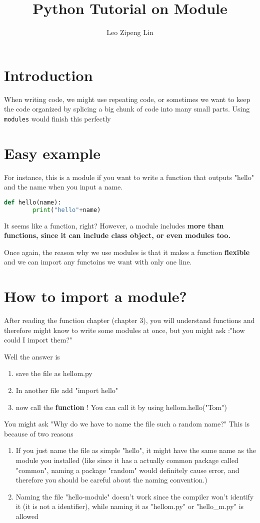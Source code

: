 \documentclass[12pt]{article}
\title{Python Tutorial on Module}
\author{Leo Zipeng Lin}
\begin{document}
\maketitle
\newpage
\section{Introduction}
\par When writing code, we might use repeating code, or sometimes we want to keep the code organized by splicing a big chunk of code into many small parts. Using \texttt{modules} would finish this perfectly
\section{Easy example}
For instance, this is a module if you want to write a function that outputs "hello" and the name when you input a name.
\begin{lstlisting}[language=python,caption=Simple example of module (function)]
def hello(name):
		print("hello"+name)
\end{lstlisting}

It seems like a function, right? However, a module includes \textbf{more than functions, since it can include class object, or even modules too.}

Once again, the reason why we use modules is that it makes a function \textbf{flexible} and we can import any functoins we want with only one line.
\section{How to import a module?}
After reading the function chapter (chapter 3), you will understand functions and therefore might know to write some modules at once, but you might ask :"how could I import them?"

Well the answer is
\begin{enumerate}
	\item save the file as hellom.py
	\item In another file add "import hello"
	\item now call the \textbf{function} ! You can call it by using hellom.hello("Tom")
\end{enumerate}
		You might ask "Why do we have to name the file such a random name?" This is because of two reasons
		\begin{enumerate}
			\item If you just name the file as simple "hello", it might have the same name as the module you installed (like since it has a actually common package called "common", naming a package "random" would definitely cause error, and therefore you should be careful about the naming convention.)
			\item Naming the file "hello-module" doesn't work since the compiler won't identify it (it is not a identifier), while naming it as "hellom.py" or "hello\_m.py" is allowed
		\end{enumerate}
\end{document}
